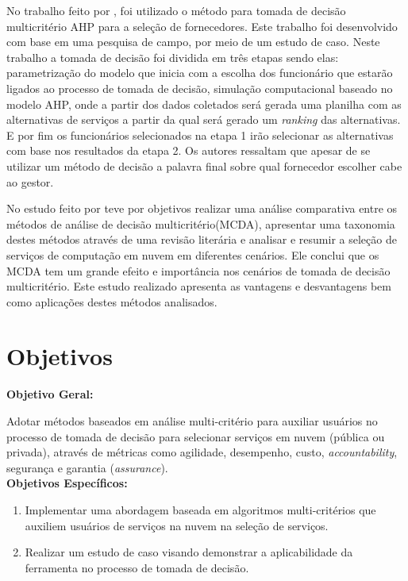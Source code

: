 \documentclass[openany, a4paper,12pt, oneside]{article}
\begin{document}
No trabalho feito por \cite{Kroenke}, foi utilizado o método para tomada de decisão multicritério AHP para a seleção de fornecedores. Este trabalho foi desenvolvido com base em uma pesquisa de campo, por meio de um estudo de caso. Neste trabalho a tomada de decisão foi dividida em três etapas sendo elas: parametrização do modelo que inicia com a escolha dos funcionário que estarão ligados ao processo de tomada de decisão, simulação computacional baseado no modelo AHP, onde a partir dos dados coletados será gerada uma planilha com as alternativas de serviços a partir da qual será gerado um \textit{ranking} das alternativas. E por fim os funcionários selecionados na etapa 1 irão selecionar as alternativas com base nos resultados da etapa 2. Os autores ressaltam que apesar de se utilizar um método de decisão a palavra final sobre qual fornecedor escolher cabe ao gestor.

No estudo feito por \cite{Whaiduzzaman} teve por objetivos realizar uma análise comparativa entre os métodos de análise de decisão multicritério(MCDA), apresentar uma taxonomia destes métodos através de uma revisão literária e analisar e resumir a seleção de serviços de computação em nuvem em diferentes cenários. Ele conclui que os MCDA tem um grande efeito e importância nos cenários de tomada de decisão multicritério. Este estudo realizado apresenta as vantagens e desvantagens bem como aplicações destes métodos analisados. 

\section{Objetivos}
\label{sec-obj}

\textbf{Objetivo Geral:\\} 
	

	Adotar métodos baseados em análise multi-critério para auxiliar usuários no processo de tomada de decisão
	para selecionar serviços em nuvem (pública ou privada), através de métricas como
	agilidade, desempenho, custo, \textit{accountability}, segurança e garantia (\textit{assurance}).
	\\
	

	
\textbf{Objetivos Específicos:\\}


\begin{enumerate}

    \item Implementar uma abordagem baseada em algoritmos multi-critérios que auxiliem usuários de serviços na nuvem na seleção de serviços.

    \item Realizar um estudo de caso visando demonstrar a aplicabilidade da ferramenta no processo de tomada de decisão.


	
	
\end{enumerate}
\end{document}
